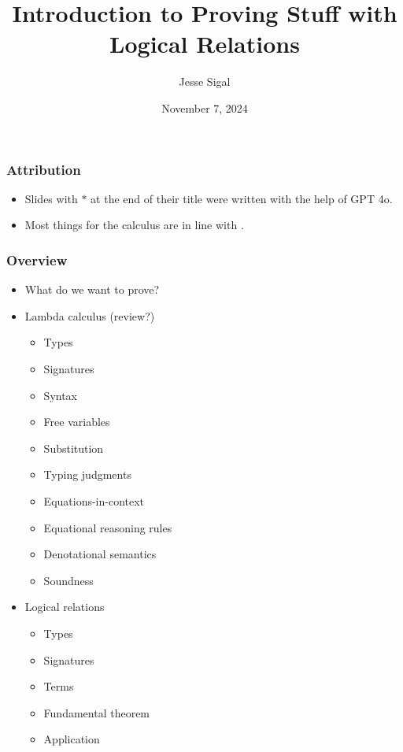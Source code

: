 \documentclass[aspectratio=169]{beamer}
\title{Introduction to Proving Stuff\textsuperscript{\texttrademark} with Logical Relations}
\author{Jesse Sigal}
\date{November 7, 2024}
\begin{document}
\begin{frame}
\titlepage
\end{frame}

\begin{frame}
\frametitle{Attribution}
\begin{itemize}
\item Slides with $*$ at the end of their title were written with the help of GPT 4o.
\item Most things for the calculus are in line with \cite{Crole_1994}.
\end{itemize}
\end{frame}

\begin{frame}
\frametitle{Overview}
\begin{itemize}
    \item What do we want to prove?
    \item Lambda calculus (review?)
    \begin{itemize}
        \item Types
        \item Signatures
        \item Syntax
        \item Free variables
        \item Substitution
        \item Typing judgments
        \item Equations-in-context
        \item Equational reasoning rules
        \item Denotational semantics
        \item Soundness
    \end{itemize}
    \item Logical relations
    \begin{itemize}
        \item Types
        \item Signatures
        \item Terms
        \item Fundamental theorem
        \item Application
    \end{itemize}
\end{itemize}
\end{frame}
\end{document}
